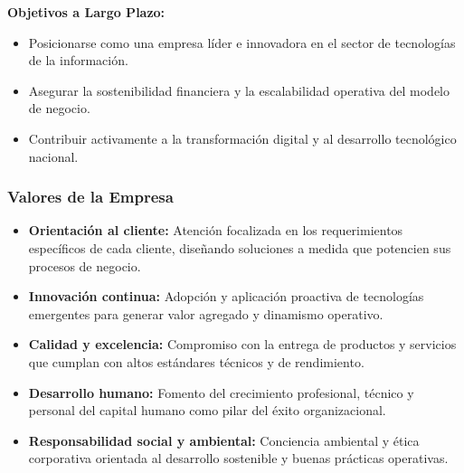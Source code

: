 
\noindent\textbf{Objetivos a Largo Plazo:}
\begin{itemize}
    \item Posicionarse como una empresa líder e innovadora en el sector de tecnologías de la información.
    \item Asegurar la sostenibilidad financiera y la escalabilidad operativa del modelo de negocio.
    \item Contribuir activamente a la transformación digital y al desarrollo tecnológico nacional.
\end{itemize}


\subsubsection{Valores de la Empresa}

\begin{itemize}
    \item \textbf{Orientación al cliente:} Atención focalizada en los requerimientos específicos de cada cliente, diseñando soluciones a medida que potencien sus procesos de negocio.
    \item \textbf{Innovación continua:} Adopción y aplicación proactiva de tecnologías emergentes para generar valor agregado y dinamismo operativo.
    \item \textbf{Calidad y excelencia:} Compromiso con la entrega de productos y servicios que cumplan con altos estándares técnicos y de rendimiento.
    \item \textbf{Desarrollo humano:} Fomento del crecimiento profesional, técnico y personal del capital humano como pilar del éxito organizacional.
    \item \textbf{Responsabilidad social y ambiental:} Conciencia ambiental y ética corporativa orientada al desarrollo sostenible y buenas prácticas operativas.
\end{itemize}